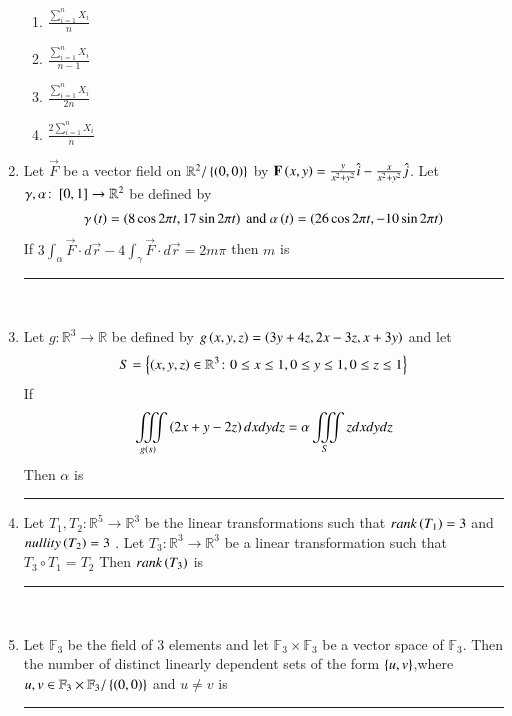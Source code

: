 \documentclass[journal,12pt,onecolumn]{IEEEtran}
\theoremstyle{remark}
\begin{document}
\begin{enumerate}
\begin{multicols}{2}
\begin{enumerate}
           \item $\frac{\sum_{i=1}^{n} X_i}{n}$\\
            \item $\frac{\sum_{i=1}^{n} X_i}{n-1}$
             \item $\frac{\sum_{i=1}^{n} X_i}{2n}$\\
              \item $\frac{2\sum_{i=1}^{n} X_i}{n}$
       \end{enumerate}
       \end{multicols}
       \item Let $\vec{F}$ be a vector field on $\mathbb{R}^2 / \left\{\left(0,0\right)\right\}$ by $\mathbf{F}\left(x,y\right) = \frac{y}{x^2 + y^2}\hat{i} - \frac{x}{x^2 + y^2}\hat{j}$. Let $\gamma , \alpha \colon {}\left[0,1\right] \rightarrow \mathbb{R}^2$ be defined by 
       \begin{align}
           \gamma \left(t\right) = \left(8 \cos{2 \pi t} , 17\sin{2\pi t}\right) \text{ and } \alpha\left(t\right) = \left(26\cos{2\pi t}, -10\sin{2 \pi t}\right)
       \end{align}
       If $3\int_{\alpha}\vec{F}\cdot d\vec{r} - 4\int_{\gamma}\vec{F}\cdot d\vec{r} = 2m\pi$ then $m$  is \rule{3cm}{0.15mm}\\
       \item Let $g \colon \mathbb{R}^3 \rightarrow \mathbb{R}$ be defined by $g\left(x,y,z\right) = \left(3y + 4z , 2x - 3z , x+ 3y\right)$ and let\begin{align} S = \left\{\left(x,y,z\right) \in \mathbb{R}^3 \colon 0 \leq x \leq 1 , 0 \leq y \leq 1 , 0 \leq z \leq 1\right\} \end{align} If
       \begin{align}
           \iiint \limits_{g\left(s\right)}\left(2x+y-2z\right)dxdydz = \alpha \iiint\limits_S z dx dy dz
       \end{align}
       Then $\alpha$ is \rule{3cm}{0.15mm}
       \item Let $T_1,T_2 \colon \mathbb{R}^5 \rightarrow \mathbb{R}^3$ be the linear transformations such that $rank\left(T_1\right) = 3$ and $nullity\left(T_2\right) = 3$ . Let $T_3 \colon \mathbb{R}^3 \rightarrow \mathbb{R}^3$ be a linear transformation such that $T_3 \circ T_1 = T_2$ Then $rank\left(T_3\right)$ is \rule{3cm}{0.15mm}\\
       \item Let $\mathbb{F}_3$ be the field of 3 elements and let $\mathbb{F}_3 \times \mathbb{F}_3$ be a vector space of $\mathbb{F}_3$. Then the number of distinct linearly dependent sets of the form $\left\{u,v\right\}$,where $u,v \in \mathbb{F}_3 \times \mathbb{F}_3 / \left\{\left(0,0\right)\right\}$ and $ u \neq v$ is \rule{3cm}{0.15mm}\\

\end{enumerate}
\end{document}

